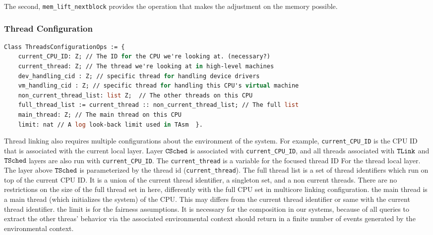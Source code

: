 The second, \lstinline$mem_lift_nextblock$ 
provides the operation that makes 
the adjustment on the memory possible. 


\subsubsection{Thread Configuration}
\begin{lstlisting}[language=Caml]
Class ThreadsConfigurationOps := {      
    current_CPU_ID: Z; // The ID for the CPU we're looking at. (necessary?) 
    current_thread: Z; // The thread we're looking at in high-level machines
    dev_handling_cid : Z; // specific thread for handling device drivers 
    vm_handling_cid : Z; // specific thread for handling this CPU's virtual machine 
    non_current_thread_list: list Z;  // The other threads on this CPU 
    full_thread_list := current_thread :: non_current_thread_list; // The full list
    main_thread: Z; // The main thread on this CPU 
    limit: nat // A log look-back limit used in TAsm  }.
\end{lstlisting}

Thread linking also requires multiple configurations about 
the environment of the system. 
For example, \lstinline$current_CPU_ID$ is the CPU ID that is 
associated with the current local layer.
Layer ${{\mathrm{\texttt{CSched}}}}$ is associated with \lstinline$current_CPU_ID$, 
and all threads associated with ${{\mathrm{\texttt{TLink}}}}$ and ${{\mathrm{\texttt{TSched}}}}$ layers 
are also run with  \lstinline$current_CPU_ID$.
The \lstinline$current_thread$ 
is a variable for the focused thread ID For the thread local layer. 
The layer above ${{\mathrm{\texttt{TSched}}}}$ is parameterized by the thread id (\lstinline$current_thread$). 
The full thread list is a set of thread identifiers 
which run on top of the current CPU ID. 
It is a union of the current thread identifier, a singleton set, 
and a non current threads. 
There are no restrictions on the size of the full thread set in here,
differently with the full CPU set in multicore linking configuration.
the main thread is a main thread (which initializes the system) of the CPU. 
This may differs from the current thread identifier or same with the current thread identifier.
the limit is for the fairness assumptions. 
It is necessary for the composition in our systems, 
because of all queries to extract the other threas' behavior via the associated environmental context 
should return in a finite number of events generated by the environmental context. 

